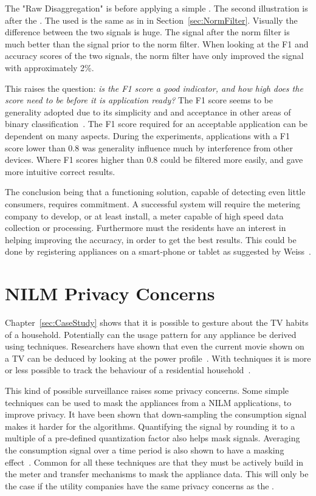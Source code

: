 The "Raw Disaggregation" is before applying a simple . The second illustration is after the . The  used is the same as in in Section~\ref{sec:NormFilter}. Visually the difference between the two signals is huge. The signal after the norm filter is much better than the signal prior to the norm filter. When looking at the F1 and accuracy scores of the two signals, the norm filter have only improved the signal with approximately 2\%.  

This raises the question: \textit{is the F1 score a good indicator, and how high does the score need to be before it is application ready?} The F1 score seems to be generality adopted due to its simplicity and and acceptance in other areas of binary classification~\citep{RefWorks:35}. The F1 score required for an acceptable application can be dependent on many aspects. During the experiments, applications with a F1 score lower than 0.8 was generality influence much by interference from other devices. Where F1 scores higher than 0.8 could be filtered more easily, and gave more intuitive correct results.  

The conclusion being that a functioning  solution, capable of detecting even little consumers, requires commitment. A successful system will require the metering company to develop, or at least install, a meter capable of high speed data collection or processing. Furthermore must the residents have an interest in helping improving the accuracy, in order to get the best results. This could be done by registering appliances on a smart-phone or tablet as suggested by Weiss~\citep{RefWorks:23}.
\newpage
\section{NILM Privacy Concerns}
Chapter~\ref{sec:CaseStudy} shows that it is possible to gesture about the TV habits of a household. Potentially can the usage pattern for any appliance be derived using  techniques. Researchers have shown that even the current movie shown on a TV can be deduced by looking at the power profile~\citep{RefWorks:39}. With  techniques it is more or less possible to track the behaviour of a residential household~\citep{RefWorks:37}.

This kind of possible surveillance raises some privacy concerns. Some simple techniques can be used to mask the appliances from a NILM applications, to improve privacy. It have been shown that down-sampling the consumption signal makes it harder for the  algorithms. Quantifying the signal by rounding it to a multiple of a pre-defined quantization factor also helps mask signals. Averaging the consumption signal over a time period is also shown to have a masking effect~\citep{RefWorks:40}. Common for all these techniques are that they must be actively build in the meter and transfer mechanisms to mask the appliance data. This will only be the case if the utility companies have the same privacy concerns as the . 

